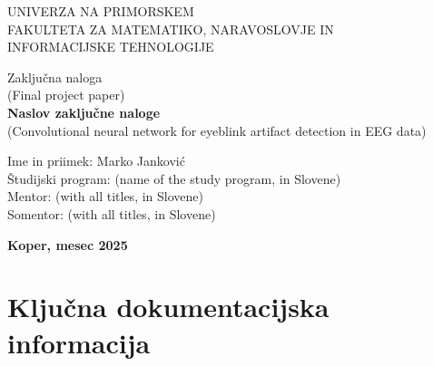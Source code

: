 \documentclass[12pt,a4paper,titlepage,openany]{report}
\begin{document}
\pagestyle{empty}
\begin{center}
\noindent \large UNIVERZA NA PRIMORSKEM\\
\large FAKULTETA ZA MATEMATIKO, NARAVOSLOVJE IN\\
INFORMACIJSKE TEHNOLOGIJE


\normalsize
\vspace{5.5cm}
Zaklju\v cna naloga\\
(Final project paper)\\
\textbf{\large Naslov zaklju\v cne naloge}\\
\normalsize
(Convolutional neural network for eyeblink artifact detection in EEG data)\\
\end{center}

\begin{flushleft}
\vspace{5cm}
\noindent Ime in priimek: Marko Janković
\\
\noindent \v Studijski program: (name of the study program, in Slovene)
\\
\noindent Mentor: (with all titles, in Slovene)
\\
\noindent Somentor: (with all titles, in Slovene)
\\
\end{flushleft}

\vspace{4cm}
\begin{center}
\large \textbf{Koper, mesec 2025}
\end{center}
\newpage

\pagestyle{fancy}

\section*{Klju\v cna dokumentacijska informacija}
\end{document}
